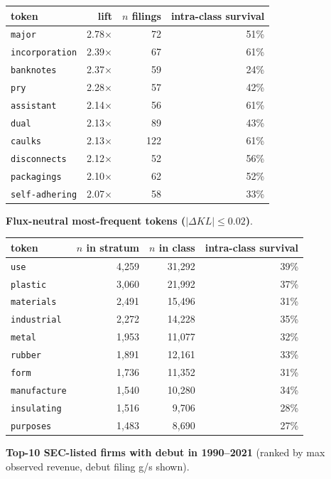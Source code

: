 \begin{tabular}{lrrr}
\toprule
token & lift & $n$ filings & intra-class survival \\
\midrule
\texttt{major} & 2.78$\times$ & 72 & 51\% \\
\texttt{incorporation} & 2.39$\times$ & 67 & 61\% \\
\texttt{banknotes} & 2.37$\times$ & 59 & 24\% \\
\texttt{pry} & 2.28$\times$ & 57 & 42\% \\
\texttt{assistant} & 2.14$\times$ & 56 & 61\% \\
\texttt{dual} & 2.13$\times$ & 89 & 43\% \\
\texttt{caulks} & 2.13$\times$ & 122 & 61\% \\
\texttt{disconnects} & 2.12$\times$ & 52 & 56\% \\
\texttt{packagings} & 2.10$\times$ & 62 & 52\% \\
\texttt{self-adhering} & 2.07$\times$ & 58 & 33\% \\
\bottomrule
\end{tabular}

\textbf{Flux-neutral most-frequent tokens ($|\Delta KL|\leq 0.02$)}.

\begin{tabular}{lrrr}
\toprule
token & $n$ in stratum & $n$ in class & intra-class survival \\
\midrule
\texttt{use} & 4,259 & 31,292 & 39\% \\
\texttt{plastic} & 3,060 & 21,992 & 37\% \\
\texttt{materials} & 2,491 & 15,496 & 31\% \\
\texttt{industrial} & 2,272 & 14,228 & 35\% \\
\texttt{metal} & 1,953 & 11,077 & 32\% \\
\texttt{rubber} & 1,891 & 12,161 & 33\% \\
\texttt{form} & 1,736 & 11,352 & 31\% \\
\texttt{manufacture} & 1,540 & 10,280 & 34\% \\
\texttt{insulating} & 1,516 & 9,706 & 28\% \\
\texttt{purposes} & 1,483 & 8,690 & 27\% \\
\bottomrule
\end{tabular}

\textbf{Top-10 SEC-listed firms with debut in 1990--2021} (ranked by max observed revenue, debut filing g/s shown).

